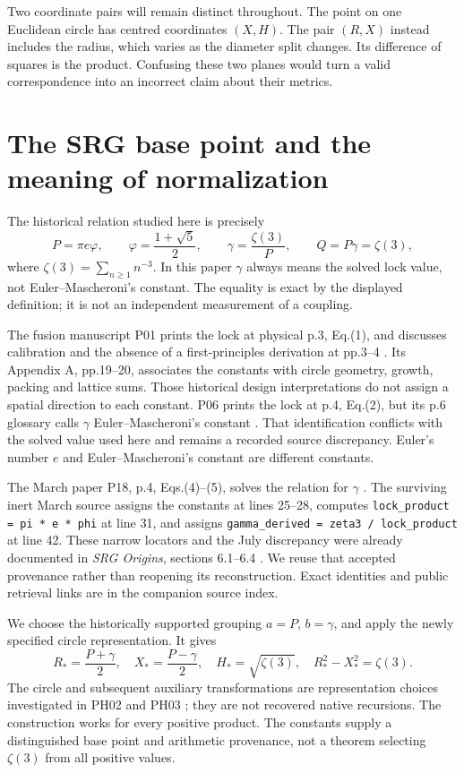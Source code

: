 \documentclass[11pt,a4paper]{article}
\begin{document}
Two coordinate pairs will remain distinct throughout. The point on one Euclidean circle has centred coordinates $(X,H)$. The pair $(R,X)$ instead includes the radius, which varies as the diameter split changes. Its difference of squares is the product. Confusing these two planes would turn a valid correspondence into an incorrect claim about their metrics.

\section{The SRG base point and the meaning of normalization}
\label{sec:source}
The historical relation studied here is precisely
\begin{equation}
 P=\pi e\varphi,\qquad \varphi=\frac{1+\sqrt5}{2},\qquad
 \gamma=\frac{\zeta(3)}{P},\qquad Q=P\gamma=\zeta(3),
 \label{eq:master}
\end{equation}
where $\zeta(3)=\sum_{n\ge1}n^{-3}$. In this paper $\gamma$ always means the solved lock value, not Euler--Mascheroni's constant. The equality is exact by the displayed definition; it is not an independent measurement of a coupling.

The fusion manuscript P01 prints the lock at physical p.3, Eq.(1), and discusses calibration and the absence of a first-principles derivation at pp.3--4 \cite{fusion}. Its Appendix A, pp.19--20, associates the constants with circle geometry, growth, packing and lattice sums. Those historical design interpretations do not assign a spatial direction to each constant. P06 prints the lock at p.4, Eq.(2), but its p.6 glossary calls $\gamma$ Euler--Mascheroni's constant \cite{dark}. That identification conflicts with the solved value used here and remains a recorded source discrepancy. Euler's number $e$ and Euler--Mascheroni's constant are different constants.

The March paper P18, p.4, Eqs.(4)--(5), solves the relation for $\gamma$ \cite{march}. The surviving inert March source assigns the constants at lines 25--28, computes \texttt{lock\_product = pi * e * phi} at line 31, and assigns \texttt{gamma\_derived = zeta3 / lock\_product} at line 42. These narrow locators and the July discrepancy were already documented in \emph{SRG Origins}, sections 6.1--6.4 \cite{origins}. We reuse that accepted provenance rather than reopening its reconstruction. Exact identities and public retrieval links are in the companion source index.

We choose the historically supported grouping $a=P$, $b=\gamma$, and apply the newly specified circle representation. It gives
\begin{equation}
 R_* =\frac{P+\gamma}{2},\quad X_* =\frac{P-\gamma}{2},\quad
 H_* =\sqrt{\zeta(3)},\quad R_*^2-X_*^2=\zeta(3).
 \label{eq:basepoint}
\end{equation}
The circle and subsequent auxiliary transformations are representation choices investigated in PH02 and PH03 \cite{ph02,ph03}; they are not recovered native recursions. The construction works for every positive product. The constants supply a distinguished base point and arithmetic provenance, not a theorem selecting $\zeta(3)$ from all positive values.
\end{document}
